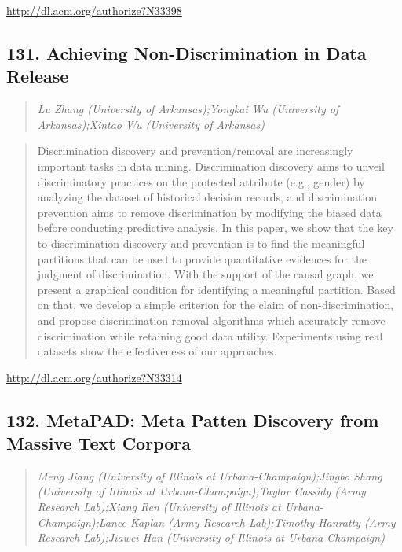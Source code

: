\documentclass{article}
\begin{document}
\href{http://dl.acm.org/authorize?N33398}{http://dl.acm.org/authorize?N33398}

\subsection{131. Achieving Non-Discrimination in Data Release}

\begin{quote}
\footnotesize{\textit{Lu Zhang (University of Arkansas);Yongkai Wu (University of Arkansas);Xintao Wu (University of Arkansas)}}

\end{quote}

\begin{quote}
Discrimination discovery and prevention/removal are increasingly important tasks in data mining. Discrimination discovery aims to unveil discriminatory practices on the protected attribute (e.g., gender) by analyzing the dataset of historical decision records, and discrimination prevention aims to remove discrimination by modifying the biased data before conducting predictive analysis. In this paper, we show that the key to discrimination discovery and prevention is to find the meaningful partitions that can be used to provide quantitative evidences for the judgment of discrimination. With the support of the causal graph, we present a graphical condition for identifying a meaningful partition. Based on that, we develop a simple criterion for the claim of non-discrimination, and propose discrimination removal algorithms which accurately remove discrimination while retaining good data utility. Experiments using real datasets show the effectiveness of our approaches.
\end{quote}

\href{http://dl.acm.org/authorize?N33314}{http://dl.acm.org/authorize?N33314}

\subsection{132. MetaPAD: Meta Patten Discovery from Massive Text Corpora}

\begin{quote}
\footnotesize{\textit{Meng Jiang (University of Illinois at Urbana-Champaign);Jingbo Shang (University of Illinois at Urbana-Champaign);Taylor Cassidy (Army Research Lab);Xiang Ren (University of Illinois at Urbana-Champaign);Lance Kaplan (Army Research Lab);Timothy Hanratty (Army Research Lab);Jiawei Han (University of Illinois at Urbana-Champaign)}}

\end{quote}
\end{document}
